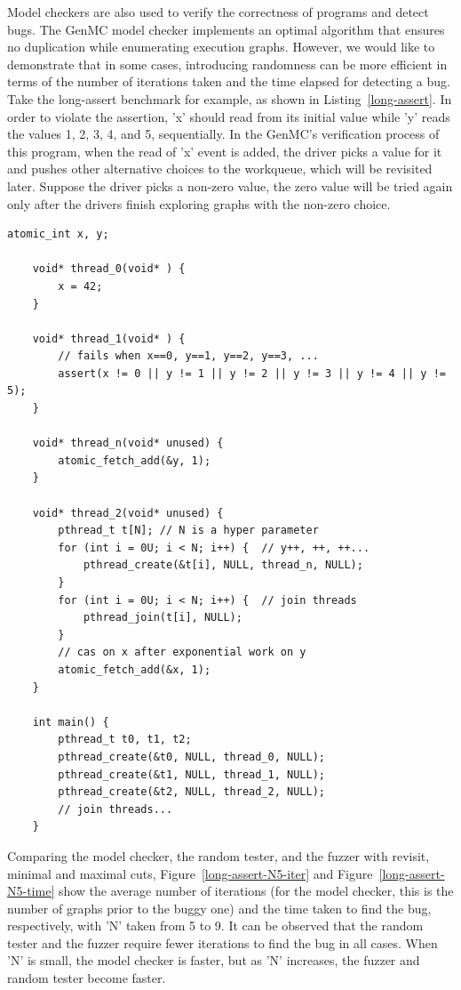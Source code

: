 Model checkers are also used to verify the correctness of programs and detect bugs. The GenMC model checker implements an optimal algorithm that ensures no duplication while enumerating execution graphs. However, we would like to demonstrate that in some cases, introducing randomness can be more efficient in terms of the number of iterations taken and the time elapsed for detecting a bug. Take the long-assert benchmark for example, as shown in Listing~\ref{long-assert}. In order to violate the assertion, 'x' should read from its initial value while 'y' reads the values 1, 2, 3, 4, and 5, sequentially. In the GenMC's verification process of this program, when the read of 'x' event is added, the driver picks a value for it and pushes other alternative choices to the workqueue, which will be revisited later. Suppose the driver picks a non-zero value, the zero value will be tried again only after the drivers finish exploring graphs with the non-zero choice.


\begin{lstlisting}[caption={long-assert}, label={long-assert}]
	atomic_int x, y;

	void* thread_0(void* ) {
		x = 42;
	}

	void* thread_1(void* ) {
		// fails when x==0, y==1, y==2, y==3, ...
		assert(x != 0 || y != 1 || y != 2 || y != 3 || y != 4 || y != 5);  
	}

	void* thread_n(void* unused) {
		atomic_fetch_add(&y, 1);
	}

	void* thread_2(void* unused) {
		pthread_t t[N];	// N is a hyper parameter
		for (int i = 0U; i < N; i++) {	// y++, ++, ++...
			pthread_create(&t[i], NULL, thread_n, NULL);
		}			
		for (int i = 0U; i < N; i++) {	// join threads
			pthread_join(t[i], NULL);
		}			
		// cas on x after exponential work on y
		atomic_fetch_add(&x, 1);
	}

	int main() {
		pthread_t t0, t1, t2;
		pthread_create(&t0, NULL, thread_0, NULL);
		pthread_create(&t1, NULL, thread_1, NULL);
		pthread_create(&t2, NULL, thread_2, NULL);
		// join threads...
	}

\end{lstlisting}

Comparing the model checker, the random tester, and the fuzzer with revisit, minimal and maximal cuts, Figure~\ref{long-assert-N5-iter} and Figure~\ref{long-assert-N5-time} show the average number of iterations (for the model checker, this is the number of graphs prior to the buggy one) and the time taken to find the bug, respectively, with 'N' taken from 5 to 9. It can be observed that the random tester and the fuzzer require fewer iterations to find the bug in all cases. When 'N' is small, the model checker is faster, but as 'N' increases, the fuzzer and random tester become faster.

